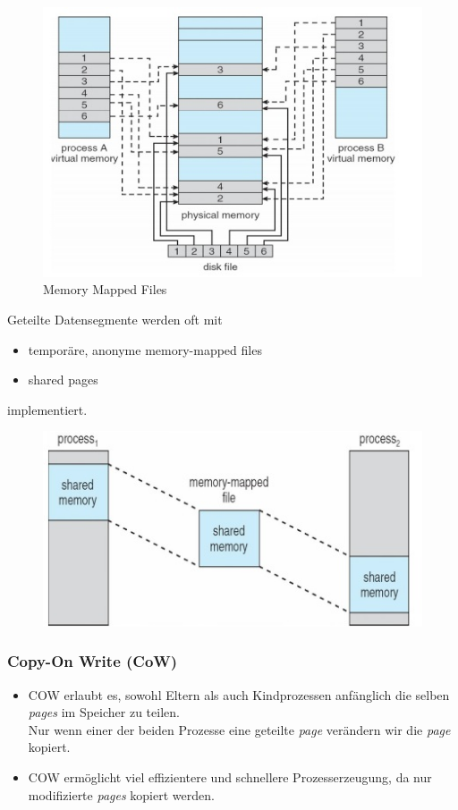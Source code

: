 \documentclass[a4paper]{scrreprt}
\begin{document}
\begin{figure}[ht]
\centering
\includegraphics[scale=0.5]{graphics/memorymappedfiles.png}
\caption{Memory Mapped Files}
\end{figure}

\newpage
Geteilte Datensegmente werden oft mit
\begin{itemize}
\item temporäre, anonyme memory-mapped files
\item shared pages
\end{itemize}
implementiert.

\begin{figure}[ht]
\centering
\includegraphics[scale=0.5]{graphics/shareddatasegment.png}
\end{figure}

\subsubsection{Copy-On Write (CoW)}
\begin{itemize}
\item COW erlaubt es, sowohl Eltern als auch Kindprozessen anfänglich die selben \textit{pages} im Speicher zu teilen. \\
Nur wenn einer der beiden Prozesse eine geteilte \textit{page} verändern wir die \textit{page} kopiert.
\item COW ermöglicht viel effizientere und schnellere Prozesserzeugung, da nur modifizierte \textit{pages} kopiert werden.
\end{itemize}
\end{document}
